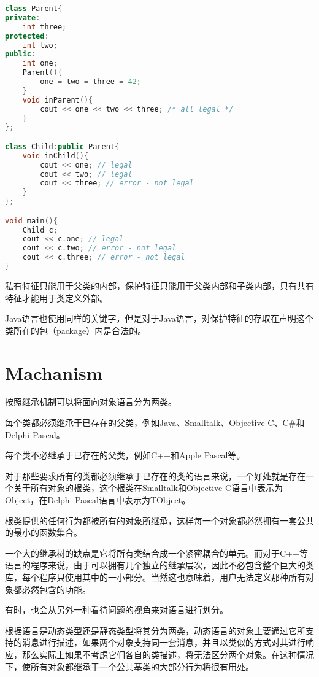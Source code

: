 \begin{lstlisting}[language=C++]
class Parent{
private:
	int three;
protected:
	int two;
public:
	int one;
	Parent(){
		one = two = three = 42;
	}
	void inParent(){
		cout << one << two << three; /* all legal */ 
	}
};

class Child:public Parent{
	void inChild(){
		cout << one; // legal
		cout << two; // legal
		cout << three; // error - not legal
	}
};

void main(){
	Child c;
	cout << c.one; // legal
	cout << c.two; // error - not legal
	cout << c.three; // error - not legal
}
\end{lstlisting}

私有特征只能用于父类的内部，保护特征只能用于父类内部和子类内部，只有共有特征才能用于类定义外部。

Java语言也使用同样的关键字，但是对于Java语言，对保护特征的存取在声明这个类所在的包（package）内是合法的。


\section{Machanism}

按照继承机制可以将面向对象语言分为两类。

\begin{compactitem}
\item 每个类都必须继承于已存在的父类，例如Java、Smalltalk、Objective-C、C\#和Delphi Pascal。
\item 每个类不必继承于已存在的父类，例如C++和Apple Pascal等。
\end{compactitem}

对于那些要求所有的类都必须继承于已存在的类的语言来说，一个好处就是存在一个关于所有对象的根类，这个根类在Smalltalk和Objective-C语言中表示为Object，在Delphi Pascal语言中表示为TObject。

根类提供的任何行为都被所有的对象所继承，这样每一个对象都必然拥有一套公共的最小的函数集合。

一个大的继承树的缺点是它将所有类结合成一个紧密耦合的单元。而对于C++等语言的程序来说，由于可以拥有几个独立的继承层次，因此不必包含整个巨大的类库，每个程序只使用其中的一小部分。当然这也意味着，用户无法定义那种所有对象都必然包含的功能。

有时，也会从另外一种看待问题的视角来对语言进行划分。

根据语言是动态类型还是静态类型将其分为两类，动态语言的对象主要通过它所支持的消息进行描述，如果两个对象支持同一套消息，并且以类似的方式对其进行响应，那么实际上如果不考虑它们各自的类描述，将无法区分两个对象。在这种情况下，使所有对象都继承于一个公共基类的大部分行为将很有用处。

